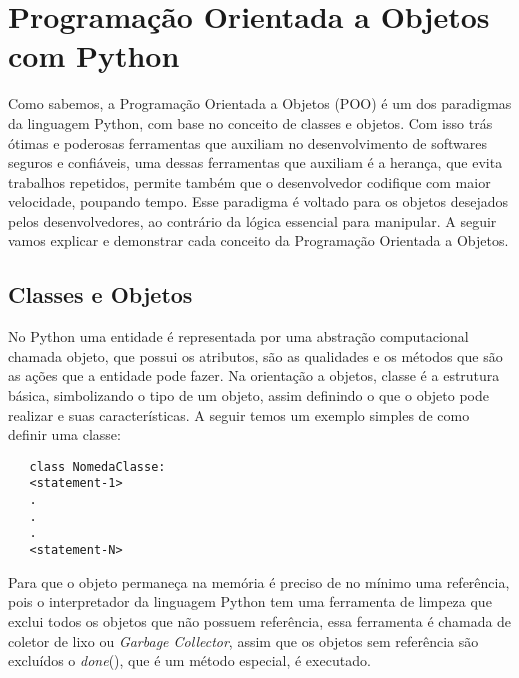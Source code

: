 

\chapter{ Programação Orientada a Objetos com Python}

	 Como sabemos, a Programação Orientada a Objetos (POO) é um dos paradigmas da linguagem Python, com base no conceito de classes e objetos. Com isso trás ótimas e poderosas ferramentas que auxiliam no desenvolvimento de softwares seguros e confiáveis, uma dessas ferramentas que auxiliam é a herança, que evita trabalhos repetidos, permite também que o desenvolvedor codifique com maior velocidade, poupando tempo. Esse paradigma é voltado para os objetos desejados pelos desenvolvedores, ao contrário da lógica essencial para manipular. A seguir vamos explicar e demonstrar cada conceito da Programação Orientada a Objetos.

    \section{Classes e Objetos}
    
	 No Python uma entidade é representada por uma abstração computacional chamada objeto, que possui os atributos, são as qualidades e os métodos que são as ações que a entidade pode fazer. Na orientação a objetos, classe é a estrutura básica, simbolizando o tipo de um objeto, assim definindo o que o objeto pode realizar e suas características. A seguir temos um exemplo simples de como definir uma classe:
	 \begin{lstlisting}
   class NomedaClasse:
   <statement-1>
   .
   .
   .
   <statement-N>
	 \end{lstlisting}
	  
	 Para que o objeto permaneça na memória é preciso de no mínimo uma referência, pois o interpretador da linguagem Python tem uma ferramenta de limpeza que exclui todos os objetos que não possuem referência, essa ferramenta é chamada de coletor de lixo ou \textit{Garbage Collector}, assim que os objetos sem referência são excluídos o \textunderscore\textunderscore \textit{done}\textunderscore\textunderscore(), que é um método especial, é executado.
	 
